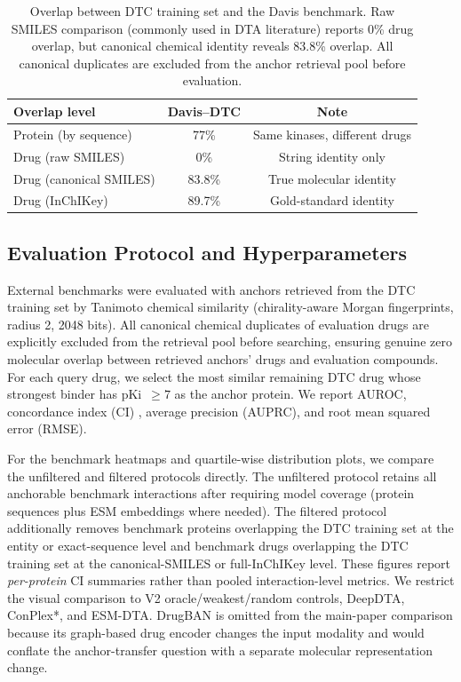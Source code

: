 \begin{table}[t]
\centering
\caption{Overlap between DTC training set and the Davis benchmark. Raw SMILES comparison (commonly used in DTA literature) reports 0\% drug overlap, but canonical chemical identity reveals 83.8\% overlap. All canonical duplicates are excluded from the anchor retrieval pool before evaluation.}
\label{tab:overlap_verification}
\begin{tabular}{lcc}
\toprule
Overlap level & Davis--DTC & Note \\
\midrule
Protein (by sequence) & 77\% & Same kinases, different drugs \\
Drug (raw SMILES) & 0\% & String identity only \\
Drug (canonical SMILES) & 83.8\% & True molecular identity \\
Drug (InChIKey) & 89.7\% & Gold-standard identity \\
\bottomrule
\end{tabular}
\end{table}

\subsection{Evaluation Protocol and Hyperparameters}

External benchmarks were evaluated with anchors retrieved from the DTC training set by Tanimoto chemical similarity (chirality-aware Morgan fingerprints, radius 2, 2048 bits). All canonical chemical duplicates of evaluation drugs are explicitly excluded from the retrieval pool before searching, ensuring genuine zero molecular overlap between retrieved anchors' drugs and evaluation compounds. For each query drug, we select the most similar remaining DTC drug whose strongest binder has pKi~$\geq 7$ as the anchor protein. We report AUROC, concordance index (CI) \cite{gonen2005concordance}, average precision (AUPRC), and root mean squared error (RMSE).

For the benchmark heatmaps and quartile-wise distribution plots, we compare the unfiltered and filtered protocols directly. The unfiltered protocol retains all anchorable benchmark interactions after requiring model coverage (protein sequences plus ESM embeddings where needed). The filtered protocol additionally removes benchmark proteins overlapping the DTC training set at the entity or exact-sequence level and benchmark drugs overlapping the DTC training set at the canonical-SMILES or full-InChIKey level. These figures report \emph{per-protein} CI summaries rather than pooled interaction-level metrics. We restrict the visual comparison to V2 oracle/weakest/random controls, DeepDTA, ConPlex*, and ESM-DTA. DrugBAN is omitted from the main-paper comparison because its graph-based drug encoder changes the input modality and would conflate the anchor-transfer question with a separate molecular representation change.

